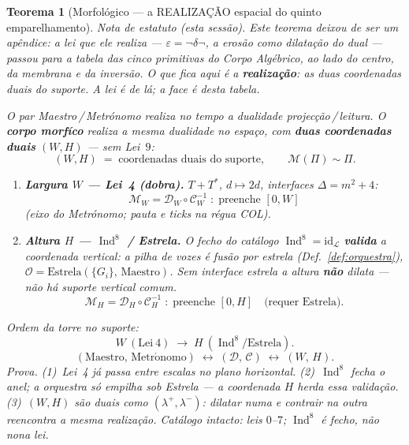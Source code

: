 \documentclass[11pt,a4paper]{article}
\newtheorem{teorema}{Teorema}
\begin{document}
\begin{teorema}[Morfológico --- a REALIZAÇÃO espacial do quinto
emparelhamento]\label{thm:morfologico}
\emph{Nota de estatuto (esta sessão).} Este teorema deixou de ser um
apêndice: a lei que ele realiza --- $\varepsilon=\neg\delta\neg$, a erosão
como dilatação do dual --- passou para a tabela das cinco primitivas do
\emph{Corpo Algébrico}, ao lado do centro, da membrana e da inversão. O
que fica aqui é a \textbf{realização}: as duas coordenadas duais do
suporte. A lei é de lá; a face é desta tabela.

O par Maestro\,/\,Metrónomo realiza no \emph{tempo} a dualidade
projecção\,/\,leitura. O \textbf{corpo morfíco} realiza a mesma
dualidade no \emph{espaço}, com \textbf{duas coordenadas duais}
$(W,H)$ --- sem Lei~$9$:
\[
\boxed{
(W,H)
\;=\;
\text{coordenadas duais do suporte},
\qquad
\mathcal{M}(\Pi)\sim\Pi.
}
\]
\begin{enumerate}
\item \textbf{Largura $W$ --- Lei~4 (dobra).}
$T+T^{*}$, $d\mapsto 2d$, interfaces $\Delta=m^{2}+4$:
\[
\boxed{
\mathcal{M}_{W}=\mathcal{D}_{W}\circ\mathcal{C}_{W}^{-1}
\;:\;
\text{preenche }[0,W]
}
\]
(eixo do Metrónomo; pauta e ticks na régua COL).
\item \textbf{Altura $H$ --- $\operatorname{Ind}^{8}$ / Estrela.}
O fecho do catálogo $\operatorname{Ind}^{8}=\mathrm{id}_{\mathcal L}$
\textbf{valida} a coordenada vertical: a pilha de vozes é fusão por
estrela (Def.~\ref{def:orquestra}),
$\mathcal{O}=\mathrm{Estrela}(\{G_i\},\,\mathrm{Maestro})$.
Sem interface estrela a altura \textbf{não} dilata --- não há suporte
vertical comum.
\[
\boxed{
\mathcal{M}_{H}=\mathcal{D}_{H}\circ\mathcal{C}_{H}^{-1}
\;:\;
\text{preenche }[0,H]
\quad\text{(requer Estrela)}.
}
\]
\end{enumerate}
Ordem da torre no suporte:
\[
\boxed{
W\ (\mathrm{Lei~4})
\;\longrightarrow\;
H\ (\operatorname{Ind}^{8}/\mathrm{Estrela}).
}
\]
\[
\boxed{
(\mathrm{Maestro},\,\mathrm{Metr\acute{o}nomo})
\;\longleftrightarrow\;
(\mathcal{D},\,\mathcal{C})
\;\longleftrightarrow\;
(W,\,H).
}
\]
\emph{Prova.} (1)~Lei~4 já passa entre escalas no plano horizontal.
(2)~$\operatorname{Ind}^{8}$ fecha o anel; a orquestra só empilha sob
Estrela --- a coordenada $H$ herda essa validação. (3)~$(W,H)$ são
duais como $(\lambda^{+},\lambda^{-})$: dilatar numa e contrair na outra
reencontra a mesma realização. Catálogo intacto: leis $0$--$7$;
$\operatorname{Ind}^{8}$ é fecho, não nona lei.
\end{teorema}
\end{document}
